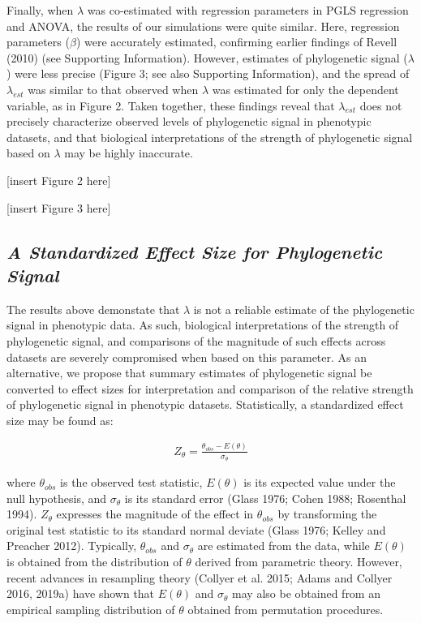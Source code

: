 \documentclass[
]{article}
\begin{document}
Finally, when \(\lambda\) was co-estimated with regression parameters in
PGLS regression and ANOVA, the results of our simulations were quite
similar. Here, regression parameters (\(\beta\)) were accurately
estimated, confirming earlier findings of Revell (2010) (see Supporting
Information). However, estimates of phylogenetic signal (\(\lambda\))
were less precise (Figure 3; see also Supporting Information), and the
spread of \(\lambda_{est}\) was similar to that observed when
\(\lambda\) was estimated for only the dependent variable, as in Figure
2. Taken together, these findings reveal that \(\lambda_{est}\) does not
precisely characterize observed levels of phylogenetic signal in
phenotypic datasets, and that biological interpretations of the strength
of phylogenetic signal based on \(\lambda\) may be highly inaccurate.
\hfill\break

{[}insert Figure 2 here{]} \hfill\break

{[}insert Figure 3 here{]} \hfill\break 

\hypertarget{a-standardized-effect-size-for-phylogenetic-signal}{%
\subsection{\texorpdfstring{\emph{A Standardized Effect Size for
Phylogenetic
Signal}}{A Standardized Effect Size for Phylogenetic Signal}}\label{a-standardized-effect-size-for-phylogenetic-signal}}

The results above demonstate that \(\lambda\) is not a reliable estimate
of the phylogenetic signal in phenotypic data. As such, biological
interpretations of the strength of phylogenetic signal, and comparisons
of the magnitude of such effects across datasets are severely
compromised when based on this parameter. As an alternative, we propose
that summary estimates of phylogenetic signal be converted to effect
sizes for interpretation and comparison of the relative strength of
phylogenetic signal in phenotypic datasets. Statistically, a
standardized effect size may be found as:

\begin{align}
    Z_{\theta}=\frac{\theta_{obs}-E(\theta)}{\sigma_\theta}
\end{align}

where \(\theta_{obs}\) is the observed test statistic, \(E(\theta)\) is
its expected value under the null hypothesis, and \(\sigma_\theta\) is
its standard error (Glass 1976; Cohen 1988; Rosenthal 1994).
\(Z_{\theta}\) expresses the magnitude of the effect in \(\theta_{obs}\)
by transforming the original test statistic to its standard normal
deviate (Glass 1976; Kelley and Preacher 2012). Typically,
\(\theta_{obs}\) and \(\sigma_\theta\) are estimated from the data,
while \(E(\theta)\) is obtained from the distribution of \(\theta\)
derived from parametric theory. However, recent advances in resampling
theory (Collyer et al. 2015; Adams and Collyer 2016, 2019a) have shown
that \(E(\theta)\) and \(\sigma_\theta\) may also be obtained from an
empirical sampling distribution of \(\theta\) obtained from permutation
procedures. \hfill\break
\end{document}
